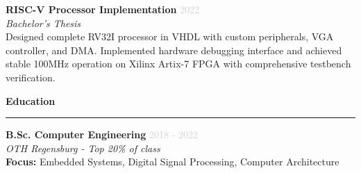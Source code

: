 \documentclass[a4paper,10pt]{article}
\newcommand{\cvsection}[1]{
    \vspace{12pt}
    {\large\bfseries\color{darkgray} #1}
    \vspace{4pt}
    \hrule
    \vspace{8pt}
}
\newcommand{\cventry}[4]{
    \vspace{3pt}
    \textbf{\color{darkgray}#1} \hfill \textcolor{lightgray}{\small #2} \\
    \textcolor{primaryblue}{\textit{\small #3}} \\
    \vspace{3pt}
    {\small #4}
    \vspace{8pt}
}
\newcommand{\cvproject}[3]{
    \vspace{3pt}
    \textbf{\color{darkgray}#1} \hfill \textcolor{lightgray}{\small #2} \\
    \textcolor{primaryblue}{\textit{\small #3}} \\[3pt]
}
\begin{document}
\begin{paracol}{2}
\vspace{8pt}

\cvproject{RISC-V Processor Implementation}{2022}{Bachelor's Thesis}
{\small Designed complete RV32I processor in VHDL with custom peripherals, VGA controller, and DMA. Implemented hardware debugging interface and achieved stable 100MHz operation on Xilinx Artix-7 FPGA with comprehensive testbench verification.}

\cvsection{Education}

\cventry{B.Sc. Computer Engineering}{2018 - 2022}{OTH Regensburg - Top 20\% of class}{
    \textbf{Focus:} Embedded Systems, Digital Signal Processing, Computer Architecture\\
}

\vspace{0.5cm}

\end{paracol}
\end{document}
